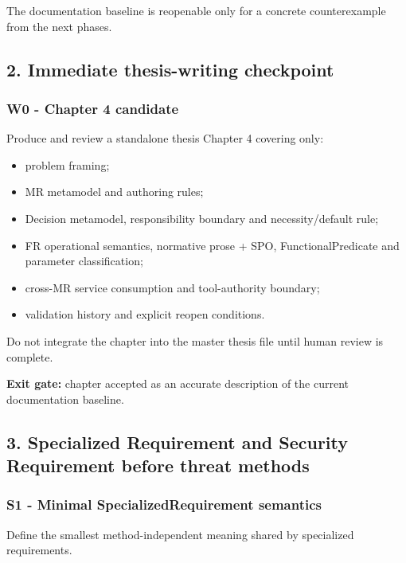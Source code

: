 \documentclass[
  11pt,
  a4paper,
]{article}
\providecommand{\tightlist}{%
  \setlength{\itemsep}{0pt}\setlength{\parskip}{0pt}}
\begin{document}
The documentation baseline is reopenable only for a concrete
counterexample from the next phases.

\subsection{2. Immediate thesis-writing
checkpoint}\label{immediate-thesis-writing-checkpoint}

\subsubsection{W0 - Chapter 4 candidate}\label{w0---chapter-4-candidate}

Produce and review a standalone thesis Chapter 4 covering only:

\begin{itemize}
\tightlist
\item
  problem framing;
\item
  MR metamodel and authoring rules;
\item
  Decision metamodel, responsibility boundary and necessity/default
  rule;
\item
  FR operational semantics, normative prose + SPO, FunctionalPredicate
  and parameter classification;
\item
  cross-MR service consumption and tool-authority boundary;
\item
  validation history and explicit reopen conditions.
\end{itemize}

Do not integrate the chapter into the master thesis file until human
review is complete.

\textbf{Exit gate:} chapter accepted as an accurate description of the
current documentation baseline.

\subsection{3. Specialized Requirement and Security Requirement before
threat
methods}\label{specialized-requirement-and-security-requirement-before-threat-methods}

\subsubsection{S1 - Minimal SpecializedRequirement
semantics}\label{s1---minimal-specializedrequirement-semantics}

Define the smallest method-independent meaning shared by specialized
requirements.
\end{document}
